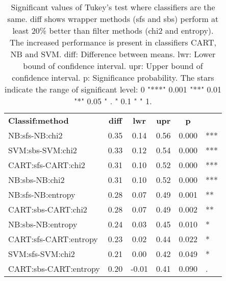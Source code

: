 \begin{table}[htbp]
\begin{center}
\begin{tabular}{|l|c|c|c|c|l}
\cline{1-5}
\textbf{Classif:method} & \textbf{diff} & \textbf{lwr} & \textbf{upr} & \textbf{p} & \\
\cline{1-5}
           NB:sfs-NB:chi2 &   0.35 &   0.14 &   0.56 &  0.000 &  *** \\
         SVM:sbs-SVM:chi2 &   0.33 &   0.12 &   0.54 &  0.000 &  *** \\
       CART:sfs-CART:chi2 &   0.31 &   0.10 &   0.52 &  0.000 &  *** \\
           NB:sbs-NB:chi2 &   0.31 &   0.10 &   0.52 &  0.000 &  *** \\
        NB:sfs-NB:entropy &   0.28 &   0.07 &   0.49 &  0.001 &   ** \\
       CART:sbs-CART:chi2 &   0.28 &   0.07 &   0.49 &  0.002 &   ** \\
        NB:sbs-NB:entropy &   0.24 &   0.03 &   0.45 &  0.010 &    * \\
    CART:sfs-CART:entropy &   0.23 &   0.02 &   0.44 &  0.022 &    * \\
         SVM:sfs-SVM:chi2 &   0.21 &   0.00 &   0.42 &  0.049 &    * \\
    CART:sbs-CART:entropy &   0.20 &  -0.01 &   0.41 &  0.090 &    . \\
\cline{1-5}
\end{tabular}
\caption[]
{\small
  Significant values of Tukey's test where classifiers are the same. diff shows wrapper methods (sfs and sbs) perform at least 20\% better than filter methods (chi2 and entropy). The increased performance is present in classifiers CART, NB and SVM. diff: Difference between means. lwr: Lower bound of confidence interval. upr: Upper bound of confidence interval. p: Significance probability. The stars indicate the range of significant level: 0 "***" 0.001 "**" 0.01 "*" 0.05 " . " 0.1 " " 1.
}
\label{table:t_test_result}
\end{center}
\end{table}
